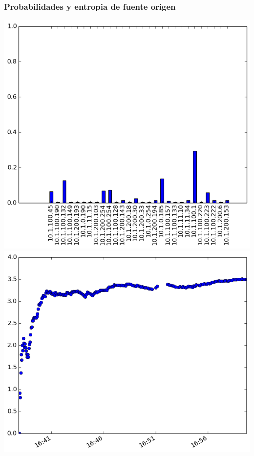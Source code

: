 \subsubsection{Probabilidades y entropia de fuente origen}
\includegraphics[scale=0.33]{../experimentacion-svilerino/licar/histogram_src_probabilities.png}
\includegraphics[scale=0.33]{../experimentacion-svilerino/licar/entropy_src.png}

